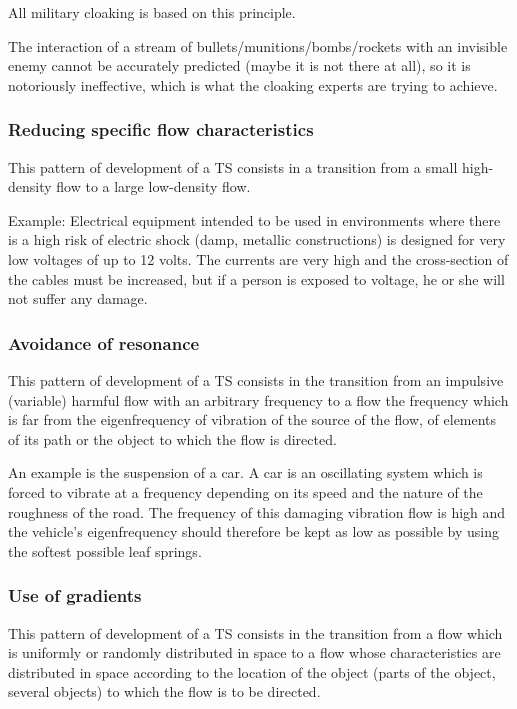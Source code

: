 \documentclass[a4paper,11pt]{article}
\begin{document}
All military cloaking is based on this principle.

The interaction of a stream of bullets/munitions/bombs/rockets with an
invisible enemy cannot be accurately predicted (maybe it is not there at all),
so it is notoriously ineffective, which is what the cloaking experts are
trying to achieve.

\subsubsection{Reducing specific flow characteristics}

This pattern of development of a TS consists in a transition from a small
high-density flow to a large low-density flow.

Example: Electrical equipment intended to be used in environments where there
is a high risk of electric shock (damp, metallic constructions) is designed
for very low voltages of up to 12 volts. The currents are very high and the
cross-section of the cables must be increased, but if a person is exposed to
voltage, he or she will not suffer any damage.

\subsubsection{Avoidance of resonance}

This pattern of development of a TS consists in the transition from an
impulsive (variable) harmful flow with an arbitrary frequency to a flow the
frequency which is far from the eigenfrequency of vibration of the source of
the flow, of elements of its path or the object to which the flow is directed.

An example is the suspension of a car. A car is an oscillating system which is
forced to vibrate at a frequency depending on its speed and the nature of the
roughness of the road. The frequency of this damaging vibration flow is high
and the vehicle's eigenfrequency should therefore be kept as low as possible
by using the softest possible leaf springs.

\subsubsection{Use of gradients}

This pattern of development of a TS consists in the transition from a flow
which is uniformly or randomly distributed in space to a flow whose
characteristics are distributed in space according to the location of the
object (parts of the object, several objects) to which the flow is to be
directed.
\end{document}
